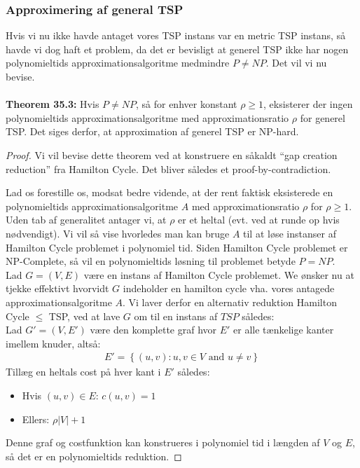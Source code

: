 \subsubsection{Approximering af general TSP}

Hvis vi nu ikke havde antaget vores TSP instans var en metric TSP instans, så havde vi dog haft et problem, da det er bevisligt at generel TSP ikke har nogen polynomieltids approximationsalgoritme medmindre $P \neq NP$. Det vil vi nu bevise.\\
~\\
\textbf{Theorem 35.3:} Hvis $P \neq NP$, så for enhver konstant $\rho \geq 1$, eksisterer der ingen polynomieltids approximationsalgoritme med approximationsratio $\rho$ for generel TSP. Det siges derfor, at approximation af generel TSP er NP-hard.

\begin{proof}
 Vi vil bevise dette theorem ved at konstruere en såkaldt ``gap creation reduction'' fra Hamilton Cycle. Det bliver således et proof-by-contradiction.

Lad os forestille os, modsat bedre vidende, at der rent faktisk eksisterede en polynomieltids approximationsalgoritme $A$ med approximationsratio $\rho$ for $\rho \geq 1$. Uden tab af generalitet antager vi, at $\rho$ er et heltal (evt. ved at runde op hvis nødvendigt). Vi vil så vise hvorledes man kan bruge $A$ til at løse instanser af Hamilton Cycle problemet i polynomiel tid. Siden Hamilton Cycle problemet er NP-Complete, så vil en polynomieltids løsning til problemet betyde $P = NP$.\\

Lad $G=(V,E)$ være en instans af Hamilton Cycle problemet. We ønsker nu at tjekke effektivt hvorvidt $G$ indeholder en hamilton cycle vha. vores antagede approximationsalgoritme $A$. Vi laver derfor en alternativ reduktion Hamilton Cycle $\leq$ TSP, ved at lave $G$ om til en instans af $TSP$ således:\\

Lad $G'=(V,E')$ være den komplette graf hvor $E'$ er alle tænkelige kanter imellem knuder, altså:
\begin{align*}
 E' = \left\lbrace (u,v) : u,v \in V \text{ and } u \neq v \right\rbrace
\end{align*}
Tillæg en heltals cost på hver kant i $E'$ således:
\begin{itemize}
 \item Hvis $(u,v) \in E$: $c(u,v) = 1$
 \item Ellers: $\rho|V|+1$
\end{itemize}
Denne graf og costfunktion kan konstrueres i polynomiel tid i længden af $V$ og $E$, så det er en polynomieltids reduktion.


\end{proof}
